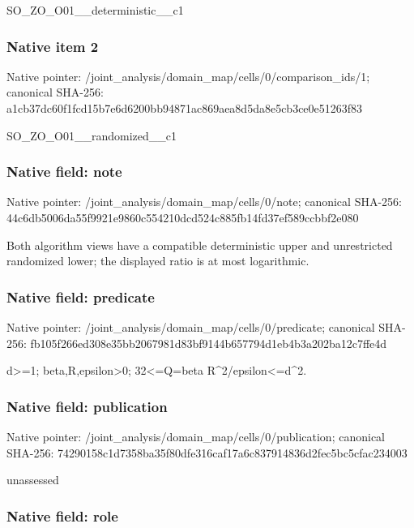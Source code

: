\documentclass[10pt,a4paper]{article}
\begin{document}
SO\_ZO\_O01\_\_deterministic\_\_c1


\subsubsection{Native item 2}


Native pointer: /joint\_analysis/domain\_m\allowbreak{}ap/cells/0/comparison\_id\allowbreak{}s/1; canonical SHA-256: a1cb37dc60f1fcd15b7e6d62\allowbreak{}00bb94871ac869aea8d5da8e\allowbreak{}5cb3ce0e51263f83


SO\_ZO\_O01\_\_randomized\_\_c1


\subsubsection{Native field: note}


Native pointer: /joint\_analysis/domain\_map/cells/0/note; canonical SHA-256: 44c6db5006da55f9921e9860\allowbreak{}c554210dcd524c885fb14fd3\allowbreak{}7ef589ccbbf2e080


Both algorithm views have a compatible deterministic upper and unrestricted randomized lower; the displayed ratio is at most logarithmic.


\subsubsection{Native field: predicate}


Native pointer: /joint\_analysis/domain\_m\allowbreak{}ap/cells/0/predicate; canonical SHA-256: fb105f266ed308e35bb20679\allowbreak{}81d83bf9144b657794d1eb4b\allowbreak{}3a202ba12c7ffe4d


d>=1; beta,R,epsilon>0; 32<=Q=beta R\textasciicircum{}2/epsilon<=d\textasciicircum{}2.


\subsubsection{Native field: publication}


Native pointer: /joint\_analysis/domain\_m\allowbreak{}ap/cells/0/publication; canonical SHA-256: 74290158c1d7358ba35f80df\allowbreak{}e316caf17a6c837914836d2f\allowbreak{}ec5bc5cfac234003


unassessed


\subsubsection{Native field: role}
\end{document}
